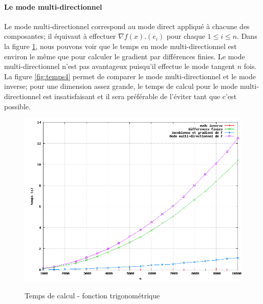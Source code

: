 % 
% 



\paragraph{Le mode multi-directionnel}
Le mode multi-directionnel correspond au mode direct appliqu\'e \`a chacune des composantes;
il \'equivaut \`a effectuer $\nabla f(x).(e_i)$ pour chaque $1\leq i\leq n$.
Dans la figure \ref{fig:temps1}, nous pouvons voir que le temps en mode multi-directionnel est
 environ le même que pour calculer le gradient par diff\'erences finies. Le mode multi-directionnel
n'est pas avantageux puisqu'il effectue le mode tangent $n$ fois. {\co La figure \ref{fig:temps4}
permet de comparer le mode multi-directionnel et le mode inverse; pour une dimension assez grande,
le temps de calcul pour le mode multi-directionnel est insatisfaisant et il sera pr\'ef\'erable de l'\'eviter
tant que c'est possible.}

\begin{figure}
\caption{Temps de calcul - fonction trigonom\'etrique}
\center
\includegraphics[scale=0.4]{figures/temps1.png}
\label{fig:temps1}
\end{figure}

